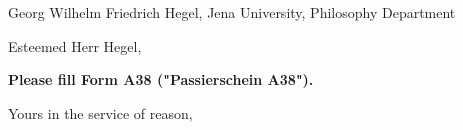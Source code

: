 \documentclass[%
    alignment       = standard,%
    visualize       = false,%
    mainaccentcolor = guardsmanred,%
    otheraccentcolor = gray,%
    layercolor      = black,%
    mainlanguage    = ngerman,%
    verbosedate     = true,%
    verboseplace    = true,%
    refvpos         = 225 pt,%
    toaddrheight    = 92pt,%
]{my-letter}
\begin{document}
\begin{letter}{Georg Wilhelm Friedrich Hegel, Jena University, Philosophy Department}

    \opening{Esteemed Herr Hegel,}

    \kant[1-2]

    \textbf{Please fill Form A38 ("Passierschein A38").}

    \closing{Yours in the service of reason,}


\end{letter}

\end{document}
